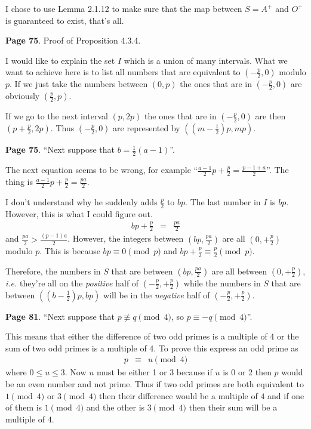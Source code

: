 \documentclass[aps,preprint,preprintnumbers,nofootinbib,showpacs,prd]{revtex4-1}
\newcommand{\ie}{{\it i.e.} }
\newcommand{\nbea}{\begin{eqnarray*}}
\newcommand{\neea}{\end{eqnarray*}}
\begin{document}
I chose to use Lemma 2.1.12 to make sure that the map between $S=A^+$ and $O^+$ is guaranteed to exist, that's all.

{\bf Page 75}. Proof of Proposition 4.3.4.

I would like to explain the set $I$ which is a union of many intervals. What we want to achieve here is to list all numbers that are equivalent to $(-\frac{p}{2}, 0)$ modulo $p$. If we just take the numbers between $(0,p)$ the ones that are in $(-\frac{p}{2}, 0)$ are obviously $(\frac{p}{2}, p)$.

If we go to the next interval $(p, 2p)$ the ones that are in $(-\frac{p}{2}, 0)$ are then $(p + \frac{p}{2}, 2p)$. Thus $(-\frac{p}{2}, 0)$ are represented by $((m - \frac{1}{2})p, mp)$.

{\bf Page 75}. ``Next suppose that $b = \frac{1}{2}(a - 1)$''.

The next equation seems to be wrong, for example ``$\frac{a-1}{2}p + \frac{p}{2} = \frac{p-1+a}{2}$''. The thing is $\frac{a-1}{2}p + \frac{p}{2} = \frac{pa}{2}$.

I don't understand why he suddenly adds $\frac{p}{2}$ to $bp$. The last number in $I$ is $bp$. However, this is what I could figure out.
%
\nbea
bp + \frac{p}{2} & = & \frac{pa}{2}
\neea
%
and $\frac{pa}{2} > \frac{(p-1)a}{2}$. However, the integers between $(bp, \frac{pa}{2})$ are all $(0, +\frac{p}{2})$ modulo $p$. This is because $bp \equiv 0 \pmod{p}$ and $bp + \frac{p}{2} \equiv \frac{p}{2} \pmod{p}$.

Therefore, the numbers in $S$ that are between $(bp, \frac{pa}{2})$ are all between $(0,+\frac{p}{2})$, \ie they're all on the {\it positive} half of $(-\frac{p}{2},+\frac{p}{2})$ while the numbers in $S$ that are between $((b - \frac{1}{2})p, bp)$ will be in the {\it negative} half of $(-\frac{p}{2},+\frac{p}{2})$.


{\bf Page 81}. ``Next suppose that $p \not\equiv q \pmod{4}$, so $p \equiv −q \pmod{4}$''.

This means that either the difference of two odd primes is a multiple of 4 or the sum of two odd primes is a multiple of 4. To prove this express an odd prime as
%
\nbea
p & \equiv & u \pmod{4}
\neea
%
where $0 \le u \le 3$. Now $u$ must be either 1 or 3 because if $u$ is 0 or 2 then $p$ would be an even number and not prime. Thus if two odd primes are both equivalent to $1 \pmod{4}$ or $3 \pmod{4}$ then their difference would be a multiple of $4$ and if one of them is $1 \pmod{4}$ and the other is $3 \pmod{4}$ then their sum will be a multiple of $4$.
\end{document}
